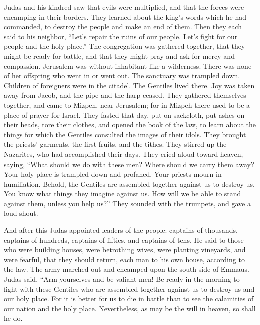  Judas and his kindred saw that evils were multiplied,
and that the forces were encamping in their borders. They learned about
the king's words which he had commanded, to destroy the people and make
an end of them.  Then they each said to his neighbor,
``Let's repair the ruins of our people. Let's fight for our people and
the holy place.''  The congregation was gathered
together, that they might be ready for battle, and that they might pray
and ask for mercy and compassion.  Jerusalem was without
inhabitant like a wilderness. There was none of her offspring who went
in or went out. The sanctuary was trampled down. Children of foreigners
were in the citadel. The Gentiles lived there. Joy was taken away from
Jacob, and the pipe and the harp ceased.  They gathered
themselves together, and came to Mizpeh, near Jerusalem; for in Mizpeh
there used to be a place of prayer for Israel.  They
fasted that day, put on sackcloth, put ashes on their heads, tore their
clothes,  and opened the book of the law, to learn about
the things for which the Gentiles consulted the images of their idols.
 They brought the priests' garments, the first fruits,
and the tithes. They stirred up the Nazarites, who had accomplished
their days.  They cried aloud toward heaven, saying,
``What should we do with these men? Where should we carry them away?
 Your holy place is trampled down and profaned. Your
priests mourn in humiliation.  Behold, the Gentiles are
assembled together against us to destroy us. You know what things they
imagine against us.  How will we be able to stand against
them, unless you help us?''  They sounded with the
trumpets, and gave a loud shout.

 And after this Judas appointed leaders of the people:
captains of thousands, captains of hundreds, captains of fifties, and
captains of tens.  He said to those who were building
houses, were betrothing wives, were planting vineyards, and were
fearful, that they should return, each man to his own house, according
to the law.  The army marched out and encamped upon the
south side of Emmaus.  Judas said, ``Arm yourselves and
be valiant men! Be ready in the morning to fight with these Gentiles who
are assembled together against us to destroy us and our holy place.
 For it is better for us to die in battle than to see the
calamities of our nation and the holy place. 
Nevertheless, as may be the will in heaven, so shall he do.

